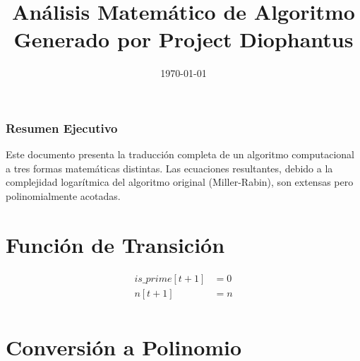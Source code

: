\documentclass[10pt, a4paper]{article}
\title{Análisis Matemático de Algoritmo \\ \large Generado por Project Diophantus}
\author{}
\date{\today}
\begin{document}
\maketitle
\section*{Resumen Ejecutivo}
Este documento presenta la traducción completa de un algoritmo computacional a tres formas matemáticas distintas.
Las ecuaciones resultantes, debido a la complejidad logarítmica del algoritmo original (Miller-Rabin), son extensas pero polinomialmente acotadas.
\part{Función de Transición}
\begin{align*}
is\_prime[t+1] &= 0 \\
n[t+1] &= n \\
\end{align*}\part{Conversión a Polinomio}
\end{document}
